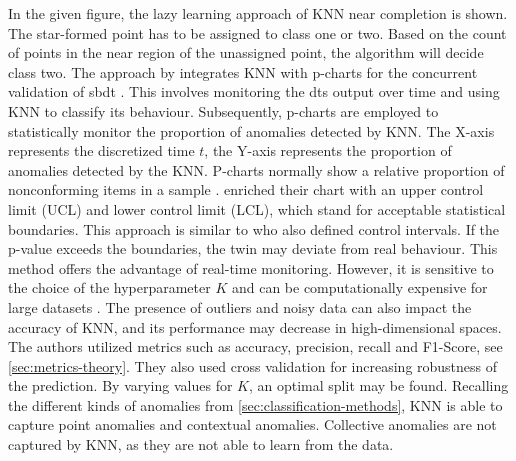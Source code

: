 In the given figure, the lazy learning approach of KNN near completion is shown. The star-formed point has to be assigned to class one or two. Based on the count of points in the near region of the unassigned point, the algorithm will decide class two.
The approach by \textcite{dos2024simulation} integrates KNN with p-charts for the concurrent validation of \gls{sbdt} \autocite{dos2024digital}. This involves monitoring the \gls{dt}s output over time and using KNN to classify its behaviour. Subsequently, p-charts are employed to statistically monitor the proportion of anomalies detected by KNN. The X-axis represents the discretized time $t$, the Y-axis represents the proportion of anomalies detected by the KNN. P-charts normally show a relative proportion of nonconforming items in a sample \autocite{acosta1999improved}. \Textcite{dos2024simulation} enriched their chart with an upper control limit (UCL) and lower control limit (LCL), which stand for acceptable statistical boundaries. This approach is similar to \textcite{Nie2023rcim} who also defined control intervals. If the p-value exceeds the boundaries, the twin may deviate from real behaviour. This method offers the advantage of real-time monitoring. However, it is sensitive to the choice of the hyperparameter $K$ and can be computationally expensive for large datasets \autocite{dos2024simulation}. The presence of outliers and noisy data can also impact the accuracy of KNN, and its performance may decrease in high-dimensional spaces. The authors utilized metrics such as accuracy, precision, recall and F1-Score, see \autoref{sec:metrics-theory}. They also used cross validation for increasing robustness of the prediction. By varying values for $K$, an optimal split may be found. Recalling the different kinds of anomalies from \autoref{sec:classification-methods}, KNN is able to capture point anomalies and contextual anomalies. Collective anomalies are not captured by KNN, as they are not able to learn from the data.

